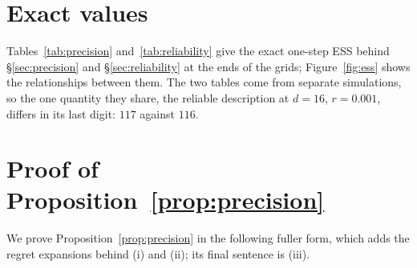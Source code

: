 \documentclass[10pt]{article}
\begin{document}



\clearpage
\appendix
\section{Exact values}\label{app:tables}

Tables~\ref{tab:precision} and~\ref{tab:reliability} give the exact one-step ESS behind \S\ref{sec:precision} and \S\ref{sec:reliability} at the ends of the grids; Figure~\ref{fig:ess} shows the relationships between them. The two tables come from separate simulations, so the one quantity they share, the reliable description at $d = 16$, $r = 0.001$, differs in its last digit: $117$ against $116$.

\begin{table}[h]
\centering\small
\caption{Exact ESS of a reliable description ($p=1$) for $a_0=10$, three seeds (standard deviation across seeds below 2\% of each value), against the rule $(d-1)(1-r) + 1/(r a_0)$ of~\eqref{eq:additive}, which is within $2.2$ examples of every cell.}
\label{tab:precision}

\end{table}

\begin{table}[h]
\centering\small
\caption{ESS of unreliable descriptions ($d=16$, $a_0=10$), three seeds; standard deviation across seeds at most 2\% of each value. Down a column precision rises tenfold per row; across a row the description is wrong never, one time in a hundred, and one time in ten.}
\label{tab:reliability}

\end{table}

\section{Proof of Proposition~\ref{prop:precision}}\label{app:precision}

We prove Proposition~\ref{prop:precision} in the following fuller form, which adds the regret expansions behind (i) and (ii); its final sentence is (iii).
\end{document}

